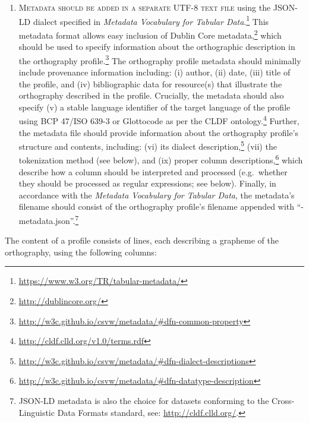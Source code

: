 \begin{enumerate}
	\item \textsc{Metadata should be added in a separate UTF-8 text file} using 
	   the JSON-LD dialect specified in \textit{Metadata Vocabulary for Tabular 
	   Data}.\footnote{\url{https://www.w3.org/TR/tabular-metadata/}} This metadata 
	   format allows easy inclusion of Dublin Core metadata,\footnote{\url{http://dublincore.org/}} 
	   which should be used to specify information about the orthographic description 
	   in the orthography profile.\footnote{\url{http://w3c.github.io/csvw/metadata/#dfn-common-property}} 
	   The orthography profile metadata should minimally include provenance information including: 
	   (i) author, (ii) date, (iii) title of the profile, and (iv)
       bibliographic data for resource(s) that illustrate the orthography
       described in the profile. Crucially, the metadata should also specify 
	   (v) a stable language identifier of the target language of the profile
       using BCP 47/ISO 639-3 or Glottocode as per the CLDF ontology.\footnote{\url{http://cldf.clld.org/v1.0/terms.rdf}}	   	   
	   Further, the metadata file should provide information about the orthography profile's structure and contents, 
	   including: (vi) its dialect description,\footnote{\url{http://w3c.github.io/csvw/metadata/#dfn-dialect-descriptions}} 
	   (vii) the tokenization method (see below), and (ix) proper column           
	   descriptions,\footnote{\url{http://w3c.github.io/csvw/metadata/#dfn-datatype-description}} 
	   which describe how a column should be interpreted and processed (e.g.\ whether they 
	   should be processed as regular expressions; see below).
	   Finally, in accordance with the \textit{Metadata Vocabulary for Tabular 
	   Data}, the metadata's filename should consist of the orthography 
	   profile's filename appended with ``-metadata.json''.\footnote{JSON-LD metadata 
	   is also the choice for datasets conforming to the Cross-Linguistic Data Formats standard, 
	   see: \url{http://cldf.clld.org/}.}

\end{enumerate}

\noindent The content of a profile consists of lines, each describing a grapheme
of the orthography, using the following columns:

